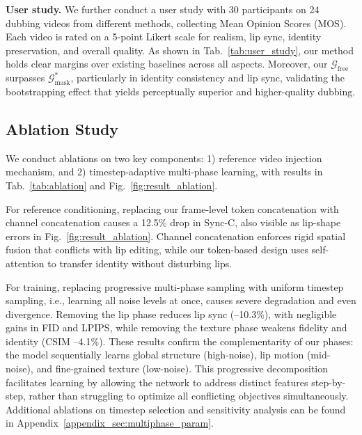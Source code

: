 \documentclass{article}
\newcommand{\myparagraph}[1]{\noindent\textbf{#1}}
\newcommand{\Gmask}{\mathcal{G}_{\text{mask}}}
\newcommand{\Gfree}{\mathcal{G}_{\text{free}}}
\theoremstyle{plain}
\theoremstyle{definition}
\theoremstyle{remark}
\begin{document}
\myparagraph{User study.}
We further conduct a user study with 30 participants on 24 dubbing videos from different methods, collecting Mean Opinion Scores (MOS).
Each video is rated on a 5-point Likert scale for realism, lip sync, identity preservation, and overall quality. As shown in Tab.~\ref{tab:user_study}, our method holds clear margins over existing baselines across all aspects. Moreover, our $\Gfree$ surpasses $\Gmask^*$, particularly in identity consistency and lip sync, validating the bootstrapping effect that yields perceptually superior and higher-quality dubbing.

\subsection{Ablation Study}
We conduct ablations on two key components: 1) reference video injection mechanism, and 2) timestep-adaptive multi-phase learning, with results in Tab.~\ref{tab:ablation} and Fig.~\ref{fig:result_ablation}.

For reference conditioning, replacing our frame-level token concatenation with channel concatenation causes a 12.5\% drop in Sync-C, also visible as lip-shape errors in Fig.~\ref{fig:result_ablation}. Channel concatenation enforces rigid spatial fusion that conflicts with lip editing, while our token-based design uses self-attention to transfer identity without disturbing lips.

For training, replacing progressive multi-phase sampling with uniform timestep sampling, i.e., learning all noise levels at once, causes severe degradation and even divergence. Removing the lip phase reduces lip sync (–10.3\%), with negligible gains in FID and LPIPS, while removing the texture phase weakens fidelity and identity (CSIM –4.1\%). These results confirm the complementarity of our phases: the model sequentially learns global structure (high-noise), lip motion (mid-noise), and fine-grained texture (low-noise). 
This progressive decomposition facilitates learning by allowing the network to address distinct features step-by-step, rather than struggling to optimize all conflicting objectives simultaneously.
Additional ablations on timestep selection and sensitivity analysis can be found in Appendix~\ref{appendix_sec:multiphase_param}.

\vspace{-5pt}
\end{document}
